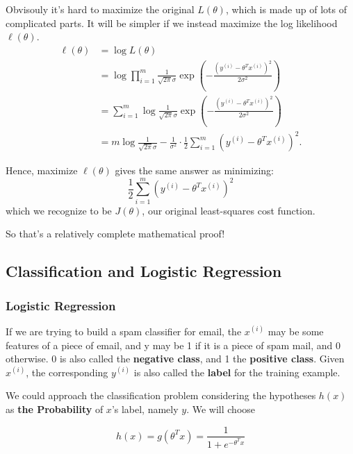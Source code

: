 \documentclass[fontset=windows,pass]{article}
\numberwithin{equation}{subsection} %
\begin{document}
Obvisouly it's hard to maximize the original $L(\theta)$, which is made up of lots of complicated parts. It will be simpler if we instead maximize the log likelihood $\ell(\theta)$.
\begin{equation}
	\begin{aligned}
		\ell(\theta) & =\log L(\theta) \\
		& =\log \prod_{i=1}^{m} \frac{1}{\sqrt{2 \pi} \sigma} \exp \left(-\frac{\left(y^{(i)}-\theta^{T} x^{(i)}\right)^{2}}{2 \sigma^{2}}\right) \\
		& =\sum_{i=1}^{m} \log \frac{1}{\sqrt{2 \pi} \sigma} \exp \left(-\frac{\left(y^{(i)}-\theta^{T} x^{(i)}\right)^{2}}{2 \sigma^{2}}\right) \\
		& =m \log \frac{1}{\sqrt{2 \pi} \sigma}-\frac{1}{\sigma^{2}} \cdot \frac{1}{2} \sum_{i=1}^{m}\left(y^{(i)}-\theta^{T} x^{(i)}\right)^{2} .
	\end{aligned}
\end{equation}

Hence, maximize $\ell(\theta)$ gives the same answer as minimizing:
\[
	\frac{1}{2} \sum_{i=1}^{m} \left(y^{(i)} - \theta^{T}x^{(i)}\right)^2
\]
which we recognize to be $J(\theta)$, our original least-squares cost function.

So that's a relatively complete mathematical proof!

\subsection{Classification and Logistic Regression}

\subsubsection{Logistic Regression}
If we are trying to build a spam classifier for email, the $x^{(i)}$ may be some features of a piece of email,
and y may be 1 if it is a piece of spam mail, and 0 otherwise. 0 is also called the \textbf{negative class},
and 1 the \textbf{positive class}. Given $x^{(i)}$, the corresponding $y^{(i)}$ is also called the \textbf{label} for the training example.

We could approach the classification problem considering the hypotheses $h(x)$ as \textbf{the Probability} of $x$'s label, namely $y$.
We will choose

\begin{equation}
	h(x) = g(\theta^{T}x) = \frac{1}{1+e^{-\theta^{T}x}}
\end{equation}
\end{document}
